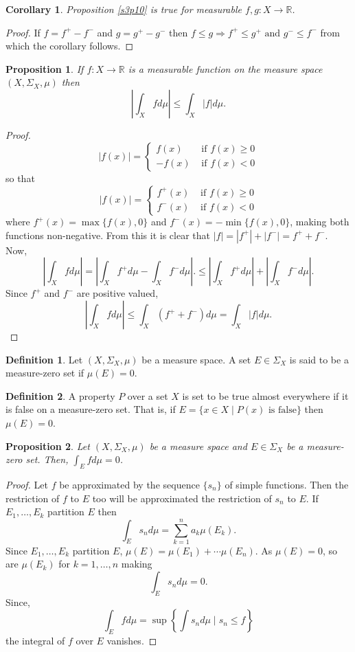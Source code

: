 \documentclass{article}
\newcommand{\sor}{\mathbb{R}}
\theoremstyle{plain}
\numberwithin{thm}{section}
\theoremstyle{plain}
\newtheorem{prop}{Proposition}
\numberwithin{prop}{section}
\theoremstyle{definition}
\newtheorem{defn}{Definition}
\numberwithin{defn}{section}
\theoremstyle{remark}
\theoremstyle{plain}
\newtheorem{cor}{Corollary}
\numberwithin{cor}{section}
\numberwithin{equation}{section}
\begin{document}
\begin{cor}\label{s3c2}
Proposition \ref{s3p10} is true for measurable $f, g: X \rightarrow \sor$.
\end{cor}
\begin{proof}
If $f = f^+ - f^-$ and $g = g^+ - g^-$ then $f \le g \Rightarrow f^+ \le
g^+ \text{ and } g^- \le f^-$ from which the corollary follows.
\end{proof}

\begin{prop}\label{s3p11}
If $f: X \rightarrow \sor$ is a measurable function on the measure space $(X,
\Sigma_X, \mu)$ then
\[
\left|\int_X fd\mu\right| \le \int_X |f|d\mu.
\]
\end{prop}
\begin{proof}
\[
|f(x)| = \begin{cases}
f(x) & \text{ if } f(x) \ge 0 \\
-f(x) & \text{ if } f(x) < 0
\end{cases}
\]
so that
\[
|f(x)| = \begin{cases}
f^+(x) & \text{ if } f(x) \ge 0 \\
f^-(x) & \text{ if } f(x) < 0
\end{cases}
\]
where $f^+(x) = \max\{f(x), 0\}$ and $f^-(x) = -\min\{f(x), 0\}$, making
both functions non-negative. From this it is clear that $|f| = |f^+| + |f^-|
= f^+ + f^-$.
Now,
\[
\left|\int_X f d\mu\right| = \left|\int_X f^+ d\mu - \int_X f^- d\mu\right|.
\le \left|\int_X f^+ d\mu\right| + \left|\int_X f^- d\mu\right|.
\]
Since $f^+$ and $f^-$ are positive valued,
\[
\left|\int_X fd\mu\right| \le \int_X (f^+ + f^-)d\mu = \int_X|f| d\mu.
\]
\end{proof}

\begin{defn}\label{s3d5}
Let $(X, \Sigma_X, \mu)$ be a measure space. A set $E \in \Sigma_X$ is 
said to be a measure-zero set if $\mu(E) = 0$.
\end{defn}

\begin{defn}\label{s3d6}
A property $P$ over a set $X$ is set to be true almost everywhere if it is 
false on a measure-zero set. That is, if $E = \{x \in X \;|\; P(x) \text{ is
false}\}$ then $\mu(E) = 0$.
\end{defn}

\begin{prop}\label{s3p12}
Let $(X, \Sigma_X, \mu)$ be a measure space and $E \in \Sigma_X$ be a measure-zero
set. Then, $\int_E fd\mu = 0$.
\end{prop}
\begin{proof}
Let $f$ be approximated by the sequence $\{s_n\}$ of simple functions. Then the
restriction of $f$ to $E$ too will be approximated the restriction of $s_n$ to
$E$. If $E_1, \ldots, E_k$ partition $E$ then
\[
\int_E s_n d\mu = \sum_{k=1}^n a_k \mu(E_k).
\]
Since $E_1, \ldots, E_k$ partition $E$, $\mu(E) = \mu(E_1) + \cdots \mu(E_n)$.
As $\mu(E) = 0$, so are $\mu(E_k)$ for $k=1, \ldots, n$ making
\[
\int_E s_n d\mu = 0.
\]
Since,
\[
\int_E f d\mu = \sup\left\{\int s_n d\mu \;|\; s_n \le f\right\}
\]
the integral of $f$ over $E$ vanishes.
\end{proof}
\end{document}
